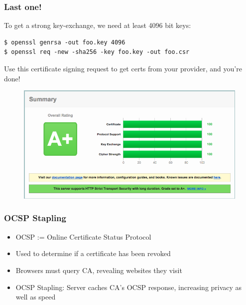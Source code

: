 \documentclass[9pt]{beamer}
\begin{document}
\begin{frame}[fragile]
\frametitle{Last one!}
To get a strong key-exchange, we need at least 4096 bit keys:
\begin{verbatim}
$ openssl genrsa -out foo.key 4096
$ openssl req -new -sha256 -key foo.key -out foo.csr
\end{verbatim}
Use this certificate signing request to get certs from your provider, and you're done!
\begin{figure}
\includegraphics[scale=0.25]{figures/App.png}
\end{figure}
\end{frame}

\begin{frame}
\frametitle{OCSP Stapling}
\begin{itemize}
\item OCSP := Online Certificate Status Protocol
\item Used to determine if a certificate has been revoked
\item Browsers must query CA, revealing websites they visit
\item OCSP Stapling: Server caches CA's OCSP response, increasing privacy as well as speed
\end{itemize}
\end{frame}
\end{document}
